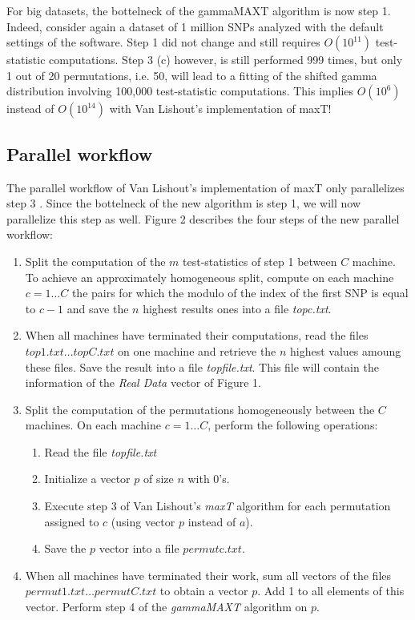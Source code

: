 \documentclass{bmcart}
\begin{document}
For big datasets, the bottelneck of the gammaMAXT algorithm is now step 1. Indeed, consider again a dataset of 1 million SNPs analyzed with the default settings of the software. Step 1 did not change and still requires $O(10^{11})$ test-statistic computations. Step 3 (c) however, is still performed 999 times, but only 1 out of 20 permutations, i.e. 50, will lead to a fitting of the shifted gamma distribution involving 100,000 test-statistic computations. This implies $O(10^6)$ instead of $O(10^{14})$ with Van Lishout's implementation of maxT!

\subsection*{Parallel workflow}
The parallel workflow of Van Lishout's implementation of maxT only parallelizes step 3 \cite{VanLishout2013}. Since the bottelneck of the new algorithm is step 1, we will now parallelize this step as well. Figure 2 describes the four steps of the new parallel workflow:

\begin{enumerate}
\item Split the computation of the $m$ test-statistics of step 1 between $C$ machine. To achieve an approximately homogeneous split, compute on each machine $c=1\ldots C$ the pairs for which the modulo of the index of the first SNP is equal to $c-1$ and save the $n$ highest results ones into a file {\em topc.txt}.
\item When all machines have terminated their computations, read the files $top1.txt\ldots topC.txt$ on one machine and retrieve the $n$ highest values amoung these files. Save the result into a file {\em topfile.txt}. This file will contain the information of the {\em Real Data} vector of Figure 1.
\item Split the computation of the permutations homogeneously between the $C$ machines. On each machine $c=1\ldots C$, perform the following operations: 
\begin{enumerate}
\item Read the file {\em topfile.txt}
\item Initialize a vector $p$ of size $n$ with 0's.
\item Execute step 3 of Van Lishout's {\em maxT} algorithm for each permutation assigned to $c$ (using vector $p$ instead of $a$).
\item Save the $p$ vector into a file $permut$c$.txt$. 
\end{enumerate}
\item When all machines have terminated their work, sum all vectors of the files $permut1.txt\ldots permutC.txt$ to obtain a vector $p$. Add 1 to all elements of this vector. Perform step 4 of the {\em gammaMAXT} algorithm on $p$.
\end{enumerate}
\end{document}
